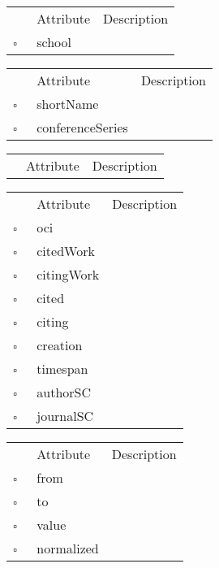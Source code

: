 \begin{table}
\caption{PhDThesis  }

\begin{longtable}{llp{8cm}}
& Attribute & Description \\
$\square$\ & school &  \\
\end{longtable}
\label{attr:PhDThesis}
\end{table}

\begin{table}
\caption{Proceedings  }

\begin{longtable}{llp{8cm}}
& Attribute & Description \\
$\square$\ & shortName &  \\
$\square$\ & conferenceSeries &  \\
\end{longtable}
\label{attr:Proceedings}
\end{table}

\clearpage
\begin{table}
\caption{Publisher  }

\begin{longtable}{llp{8cm}}
& Attribute & Description \\
\end{longtable}
\label{attr:Publisher}
\end{table}

\begin{table}
\caption{Reference  }

\begin{longtable}{llp{8cm}}
& Attribute & Description \\
$\square$\ & oci &  \\
$\square$\ & citedWork &  \\
$\square$\ & citingWork &  \\
$\square$\ & cited &  \\
$\square$\ & citing &  \\
$\square$\ & creation &  \\
$\square$\ & timespan &  \\
$\square$\ & authorSC &  \\
$\square$\ & journalSC &  \\
\end{longtable}
\label{attr:Reference}
\end{table}

\begin{table}
\caption{ReferenceFlow  }

\begin{longtable}{llp{8cm}}
& Attribute & Description \\
$\square$\ & from &  \\
$\square$\ & to &  \\
$\square$\ & value &  \\
$\square$\ & normalized &  \\
\end{longtable}
\label{attr:ReferenceFlow}
\end{table}

